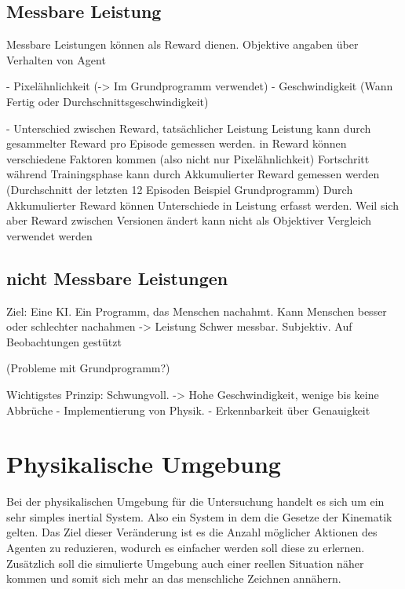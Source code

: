     \subsection*{Messbare Leistung}
    Messbare Leistungen können als Reward dienen. Objektive angaben über Verhalten von Agent
    
    - Pixelähnlichkeit (-> Im Grundprogramm verwendet)
    - Geschwindigkeit (Wann Fertig oder Durchschnittsgeschwindigkeit)
    
    - Unterschied zwischen Reward, tatsächlicher Leistung
      Leistung kann durch gesammelter Reward pro Episode gemessen werden. in Reward können verschiedene Faktoren kommen (also nicht nur Pixelähnlichkeit)
      Fortschritt während Trainingsphase kann durch Akkumulierter Reward gemessen werden (Durchschnitt der letzten 12 Episoden Beispiel Grundprogramm)
      Durch Akkumulierter Reward können Unterschiede in Leistung erfasst werden. Weil sich aber Reward zwischen Versionen ändert kann nicht als Objektiver Vergleich verwendet werden
    
    \subsection*{nicht Messbare Leistungen}
    Ziel: Eine KI. Ein Programm, das Menschen nachahmt. 
    Kann Menschen besser oder schlechter nachahmen -> Leistung
    Schwer messbar. Subjektiv. Auf Beobachtungen gestützt

    (Probleme mit Grundprogramm?)
    
    Wichtigstes Prinzip: Schwungvoll. -> Hohe Geschwindigkeit, wenige bis keine Abbrüche
        - Implementierung von Physik. 
        - Erkennbarkeit über Genauigkeit


\section{Physikalische Umgebung}
Bei der physikalischen Umgebung für die Untersuchung handelt es sich um ein sehr
simples inertial System. Also ein System in dem die Gesetze der Kinematik
gelten. Das Ziel dieser Veränderung ist es die Anzahl möglicher Aktionen des
Agenten zu reduzieren, wodurch es einfacher werden soll diese zu erlernen.
Zusätzlich soll die simulierte Umgebung auch einer reellen Situation näher
kommen und somit sich mehr an das menschliche Zeichnen annähern.

